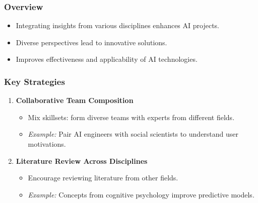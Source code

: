 \documentclass[aspectratio=169]{beamer}
\begin{document}
\begin{frame}[fragile]
    \frametitle{Overview}
    \begin{itemize}
        \item Integrating insights from various disciplines enhances AI projects.
        \item Diverse perspectives lead to innovative solutions.
        \item Improves effectiveness and applicability of AI technologies.
    \end{itemize}
\end{frame}

\begin{frame}[fragile]
    \frametitle{Key Strategies}
    \begin{enumerate}
        \item \textbf{Collaborative Team Composition}
            \begin{itemize}
                \item Mix skillsets: form diverse teams with experts from different fields.
                \item \textit{Example:} Pair AI engineers with social scientists to understand user motivations.
            \end{itemize}
        \item \textbf{Literature Review Across Disciplines}
            \begin{itemize}
                \item Encourage reviewing literature from other fields.
                \item \textit{Example:} Concepts from cognitive psychology improve predictive models.
            \end{itemize}
    \end{enumerate}
\end{frame}
\end{document}
